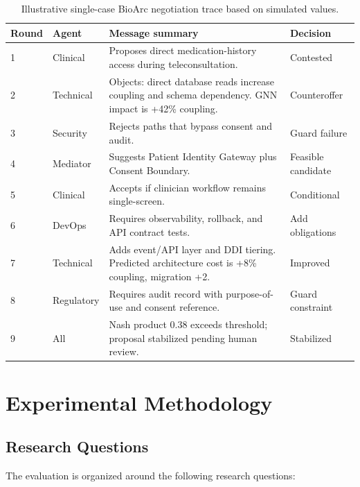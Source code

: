 \documentclass[english,preprint,nonatbib]{elsarticle}
\begin{document}
\begin{longtable}{p{1.2cm}p{2.2cm}p{9.3cm}p{2.8cm}}
\caption{Illustrative single-case BioArc negotiation trace based on simulated values.}\label{tab:bioarc-trace}\\
\toprule
Round & Agent & Message summary & Decision \\
\midrule
1 & Clinical & Proposes direct medication-history access during teleconsultation.
& Contested \\
2 & Technical & Objects: direct database reads increase coupling and schema dependency. GNN impact is +42\% coupling.
& Counteroffer \\
3 & Security & Rejects paths that bypass consent and audit.
& Guard failure \\
4 & Mediator & Suggests Patient Identity Gateway plus Consent Boundary.
& Feasible candidate \\
5 & Clinical & Accepts if clinician workflow remains single-screen.
& Conditional \\
6 & DevOps & Requires observability, rollback, and API contract tests.
& Add obligations \\
7 & Technical & Adds event/API layer and DDI tiering.
Predicted architecture cost is +8\% coupling, migration +2.
& Improved \\
8 & Regulatory & Requires audit record with purpose-of-use and consent reference.
& Guard constraint \\
9 & All & Nash product 0.38 exceeds threshold; proposal stabilized pending human review.
& Stabilized \\
\bottomrule
\end{longtable}

\section{Experimental Methodology}
\label{sec:methodology}

\subsection{Research Questions}

The evaluation is organized around the following research questions:
\end{document}
